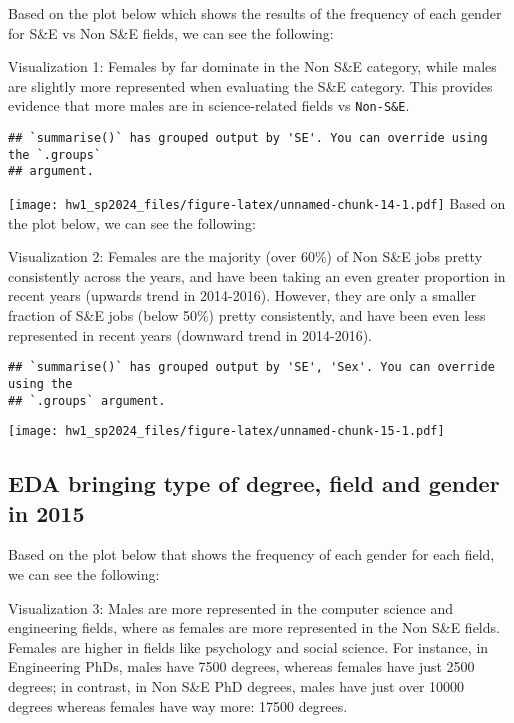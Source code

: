 \documentclass[
]{article}
\begin{document}
Based on the plot below which shows the results of the frequency of each
gender for S\&E vs Non S\&E fields, we can see the following:

Visualization 1: Females by far dominate in the Non S\&E category, while
males are slightly more represented when evaluating the S\&E category.
This provides evidence that more males are in science-related fields vs
\texttt{Non-S\&E}.

\begin{verbatim}
## `summarise()` has grouped output by 'SE'. You can override using the `.groups`
## argument.
\end{verbatim}

\texttt{[image: hw1\_sp2024\_files/figure-latex/unnamed-chunk-14-1.pdf]}
Based on the plot below, we can see the following:

Visualization 2: Females are the majority (over 60\%) of Non S\&E jobs
pretty consistently across the years, and have been taking an even
greater proportion in recent years (upwards trend in 2014-2016).
However, they are only a smaller fraction of S\&E jobs (below 50\%)
pretty consistently, and have been even less represented in recent years
(downward trend in 2014-2016).

\begin{verbatim}
## `summarise()` has grouped output by 'SE', 'Sex'. You can override using the
## `.groups` argument.
\end{verbatim}

\texttt{[image: hw1\_sp2024\_files/figure-latex/unnamed-chunk-15-1.pdf]}

\hypertarget{eda-bringing-type-of-degree-field-and-gender-in-2015}{%
\subsection{EDA bringing type of degree, field and gender in
2015}\label{eda-bringing-type-of-degree-field-and-gender-in-2015}}

Based on the plot below that shows the frequency of each gender for each
field, we can see the following:

Visualization 3: Males are more represented in the computer science and
engineering fields, where as females are more represented in the Non
S\&E fields. Females are higher in fields like psychology and social
science. For instance, in Engineering PhDs, males have 7500 degrees,
whereas females have just 2500 degrees; in contrast, in Non S\&E PhD
degrees, males have just over 10000 degrees whereas females have way
more: 17500 degrees.
\end{document}
